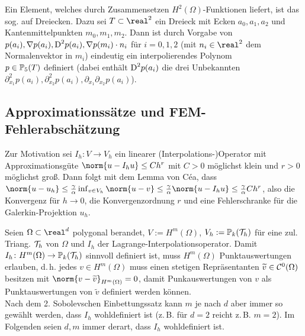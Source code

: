 \linie

\begin{Bem}
    Ein Element, welches durch Zusammensetzen $H^2(\Omega)$-Funktionen liefert, ist das sog.
     auf Dreiecken.
    Dazu sei $T \subset \real^2$ ein Dreieck mit Ecken $a_0, a_1, a_2$ und
    Kantenmittelpunkten $m_0, m_1, m_2$.
    Dann ist durch Vorgabe von $p(a_i), \nabla p(a_i), \text{D}^2 p(a_i), \nabla p(m_i) \cdot n_i$
    für $i = 0, 1, 2$ (mit $n_i \in \real^2$ dem Normalenvektor in $m_i$) eindeutig ein
    interpolierendes Polynom\\
    $p \in \mathbb{P}_5(T)$ definiert
    (dabei enthält $\text{D}^2 p(a_i)$ die drei Unbekannten
    $\partial_{x_1}^2 p(a_i), \partial_{x_2}^2 p(a_i), \partial_{x_1} \partial_{x_2} p(a_i)$).
\end{Bem}

\pagebreak

\subsection{%
    Approximationssätze und FEM-Fehlerabschätzung%
}

\begin{Bem}
    Zur Motivation sei $I_h\colon V \to V_h$ ein linearer (Interpolations-)Operator mit
    Approximationsgüte $\norm{u - I_h u} \le Ch^r$ mit $C > 0$ möglichst klein und
    $r > 0$ möglichst groß.
    Dann folgt mit dem Lemma von Céa, dass
    $\norm{u - u_h} \le \frac{\gamma}{\alpha} \inf_{v \in V_h} \norm{u - v}
    \le \frac{\gamma}{\alpha} \norm{u - I_h u} \le \frac{\gamma}{\alpha} Ch^r$,
    also die Konvergenz für $h \to 0$, die Konvergenzordnung $r$ und eine
    Fehlerschranke für die Galerkin-Projektion $u_h$.
\end{Bem}

\begin{Bem}
    Seien $\Omega \subset \real^d$ polygonal berandet, $V := H^m(\Omega)$,
    $V_h := \mathbb{P}_k(\mathcal{T}_h)$ für eine zul. Triang. $\mathcal{T}_h$ von $\Omega$
    und $I_h$ der Lagrange-Interpolationsoperator.
    Damit $I_h\colon H^m(\Omega) \to \mathbb{P}_k(\mathcal{T}_h)$ sinnvoll definiert ist,
    muss $H^m(\Omega)$ Punktauswertungen erlauben,
    d.\,h. jedes $v \in H^m(\Omega)$ muss einen stetigen Repräsentanten
    $\widetilde{v} \in \mathcal{C}^0(\Omega)$ besitzen mit $\norm{v - \widetilde{v}}_{H^m(\Omega)} = 0$,
    damit Punkauswertungen von $v$ als Punktauswertungen von $\widetilde{v}$ definiert werden
    können.\\
    Nach dem 2. Sobolevschen Einbettungssatz kann $m$ je nach $d$ aber immer so gewählt werden,
    dass $I_h$ wohldefiniert ist
    (z.\,B. für $d = 2$ reicht z.\,B. $m = 2$).
    Im Folgenden seien $d, m$ immer derart, dass $I_h$ wohldefiniert ist.
\end{Bem}

